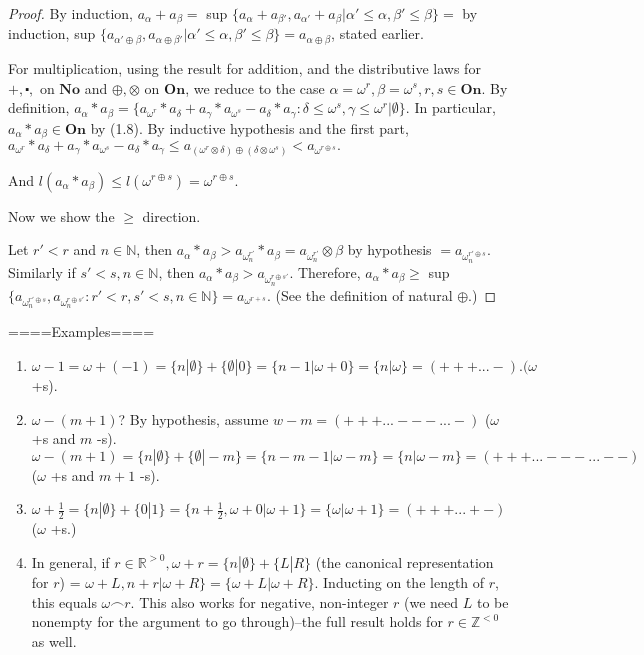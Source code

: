 \begin{proof} %

By induction, $a_\alpha + a_\beta =$ sup $\{a_\alpha + a_{\beta'}, a_{\alpha'} + a_\beta | \alpha' \leq \alpha, \beta' \leq \beta \}  =$ by induction, sup $\{a_{\alpha' \oplus \beta}, a_{\alpha \oplus \beta'} | \alpha' \leq \alpha, \beta' \leq \beta \} = a_{\alpha \oplus \beta}$, stated earlier.

For multiplication, using the result for addition, and the distributive laws for $+, \centerdot,$ on $\mathbf{No}$ and $\oplus, \otimes$ on $\mathbf{On}$, we reduce to the case $\alpha = \omega^r, \beta= \omega^s, r, s \in \mathbf{On}$. By definition, $a_\alpha * a_\beta = \{a_{\omega^r} * a_\delta + a_{\gamma}*a_{\omega^s} - a_{\delta}*a_{\gamma} : \delta \leq \omega^s, \gamma \leq \omega^r | \emptyset \}.$ In particular, $a_\alpha * a_\beta \in \mathbf{On}$ by (1.8). By inductive hypothesis and the first part, $a_{\omega^r} * a_\delta + a_{\gamma}*a_{\omega^s} - a_{\delta}*a_{\gamma} \leq a_{(\omega^r \otimes \delta) \oplus (\delta \otimes \omega^s)} < a_{\omega^{r \oplus s}}.$

And $l(a_\alpha * a_\beta) \leq l(\omega^{r \oplus s}) = \omega^{r \oplus s}$.

Now we show the $\geq$ direction.

Let $r'<r$ and $n \in \mathbb{N}$, then $a_\alpha * a_\beta > a_{\omega^{r'}_n} * a_{\beta}=a_{\omega^{r'}_n} \otimes \beta$ by hypothesis $=a_{\omega^{r' \oplus s}_n}$. Similarly if $s'<s, n \in \mathbb{N}$, then $a_\alpha * a_\beta > a_{\omega^{r \oplus s'}_n}$. Therefore, $a_\alpha * a_\beta \geq$ sup $\{a_{\omega^{r' \oplus s}_n}, a_{\omega^{r \oplus s'}_n}  : r' <r, s' <s, n \in \mathbb{N} \} = a_{\omega^{r+s}}$. (See the definition of natural $\oplus$.)
 \end{proof}

====Examples====

\begin{enumerate}
  \item  $\omega -1 = \omega + (-1) = \{n|\emptyset \} + \{\emptyset|0\}=\{n-1|\omega + 0\}= \{n|\omega\} = (+++...-). (\omega$ +s).
  \item  $\omega - (m+1)$? By hypothesis, assume $w-m = (+++...---...-)$ ($\omega$ +s and $m$ -s). $\omega - (m+1)= \{n|\emptyset \} + \{\emptyset|-m\} = \{n-m-1|\omega -m\} = \{n|\omega-m\} = (+++...---...--)$ ($\omega$ +s and $m+1$ -s).
  \item  $\omega + \frac{1}{2} = \{n|\emptyset \} + \{0|1\} = \{n + \frac{1}{2}, \omega + 0 | \omega +1\} = \{\omega | \omega +1\}=(+++...+-)$ ($\omega$ +s.)
  \item  In general, if $r \in \mathbb{R}^{>0}, \omega + r = \{n|\emptyset \} + \{L|R\}$ (the canonical representation for $r$) = $\omega + L, n+r | \omega +R\} = \{\omega + L | \omega + R \}$. Inducting on the length of $r$, this equals $\omega \frown r$. This also works for negative, non-integer $r$ (we need $L$ to be nonempty for the argument to go through)--the full result holds for $r \in \mathbb{Z}^{<0}$ as well.
\end{enumerate}

